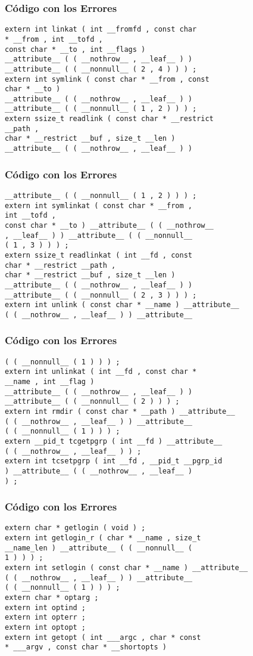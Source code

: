\documentclass{beamer}
\begin{document}
\begin{frame}[fragile]
\frametitle{C\'odigo con los Errores}
\begin{verbatim}
extern int linkat ( int __fromfd , const char 
* __from , int __tofd , 
const char * __to , int __flags ) 
__attribute__ ( ( __nothrow__ , __leaf__ ) ) 
__attribute__ ( ( __nonnull__ ( 2 , 4 ) ) ) ; 
extern int symlink ( const char * __from , const 
char * __to ) 
__attribute__ ( ( __nothrow__ , __leaf__ ) ) 
__attribute__ ( ( __nonnull__ ( 1 , 2 ) ) ) ; 
extern ssize_t readlink ( const char * __restrict 
__path , 
char * __restrict __buf , size_t __len ) 
__attribute__ ( ( __nothrow__ , __leaf__ ) ) 
\end{verbatim}
\end{frame}
\begin{frame}[fragile]
\frametitle{C\'odigo con los Errores}
\begin{verbatim}
__attribute__ ( ( __nonnull__ ( 1 , 2 ) ) ) ; 
extern int symlinkat ( const char * __from , 
int __tofd , 
const char * __to ) __attribute__ ( ( __nothrow__ 
, __leaf__ ) ) __attribute__ ( ( __nonnull__ 
( 1 , 3 ) ) ) ; 
extern ssize_t readlinkat ( int __fd , const 
char * __restrict __path , 
char * __restrict __buf , size_t __len ) 
__attribute__ ( ( __nothrow__ , __leaf__ ) ) 
__attribute__ ( ( __nonnull__ ( 2 , 3 ) ) ) ; 
extern int unlink ( const char * __name ) __attribute__ 
( ( __nothrow__ , __leaf__ ) ) __attribute__ 
\end{verbatim}
\end{frame}
\begin{frame}[fragile]
\frametitle{C\'odigo con los Errores}
\begin{verbatim}
( ( __nonnull__ ( 1 ) ) ) ; 
extern int unlinkat ( int __fd , const char * 
__name , int __flag ) 
__attribute__ ( ( __nothrow__ , __leaf__ ) ) 
__attribute__ ( ( __nonnull__ ( 2 ) ) ) ; 
extern int rmdir ( const char * __path ) __attribute__ 
( ( __nothrow__ , __leaf__ ) ) __attribute__ 
( ( __nonnull__ ( 1 ) ) ) ; 
extern __pid_t tcgetpgrp ( int __fd ) __attribute__ 
( ( __nothrow__ , __leaf__ ) ) ; 
extern int tcsetpgrp ( int __fd , __pid_t __pgrp_id 
) __attribute__ ( ( __nothrow__ , __leaf__ ) 
) ; 
\end{verbatim}
\end{frame}
\begin{frame}[fragile]
\frametitle{C\'odigo con los Errores}
\begin{verbatim}
extern char * getlogin ( void ) ; 
extern int getlogin_r ( char * __name , size_t 
__name_len ) __attribute__ ( ( __nonnull__ ( 
1 ) ) ) ; 
extern int setlogin ( const char * __name ) __attribute__ 
( ( __nothrow__ , __leaf__ ) ) __attribute__ 
( ( __nonnull__ ( 1 ) ) ) ; 
extern char * optarg ; 
extern int optind ; 
extern int opterr ; 
extern int optopt ; 
extern int getopt ( int ___argc , char * const 
* ___argv , const char * __shortopts ) 
\end{verbatim}
\end{frame}
\end{document}
